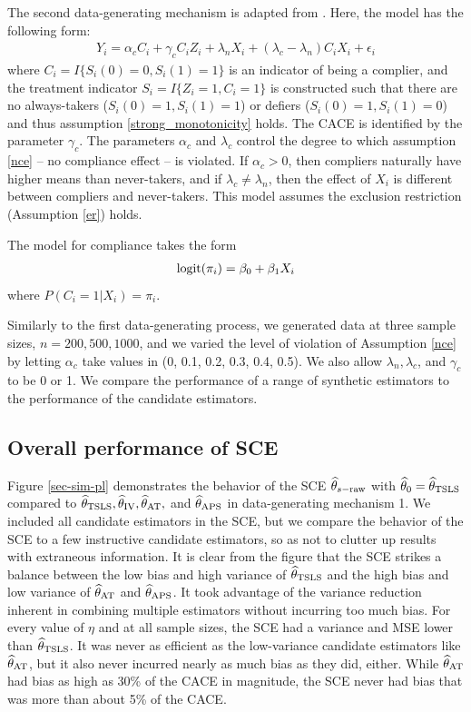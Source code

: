 \documentclass{article}
\def\siv{_{\text{IV}}}
\def\sat{_{\text{AT}}}
\def\stsls{_{\text{TSLS}}}
\def\saps{_{\text{APS}}}
\begin{document}
The second data-generating mechanism is adapted from \citep{stuart2015assessing}. Here, the model has the following form:
\begin{align}
Y_i = \alpha_c C_i + \gamma_cC_iZ_i + \lambda_n X_i + (\lambda_c - \lambda_n)C_iX_i + \epsilon_i
\end{align}
where $C_i = I\{S_i(0) = 0, S_i(1) = 1\}$ is an indicator of being a complier, and the treatment indicator $S_i = I\{Z_i = 1, C_i = 1\}$ is constructed such that there are no always-takers ($S_i(0) = 1, S_i(1) = 1$) or defiers ($S_i(0) = 1, S_i(1) = 0$) and thus assumption \ref{strong_monotonicity} holds. The CACE is identified by the parameter $\gamma_c$. The parameters $\alpha_c$ and $\lambda_c$ control the degree to which assumption \ref{nce} -- no compliance effect -- is violated. If $\alpha_c > 0$, then compliers naturally have higher means than never-takers, and if $\lambda_c \neq \lambda_n$, then the effect of $X_i$ is different between compliers and never-takers. This model assumes the exclusion restriction (Assumption \ref{er}) holds.

The model for compliance takes the form
\begin{align}
\mbox{logit}(\pi_i) = \beta_0 + \beta_1X_i
\end{align}
where $P(C_i = 1 | X_i) = \pi_i$.

Similarly to the first data-generating process, we generated data at three sample sizes, $n = 200, 500, 1000$, and we varied the level of violation of Assumption \ref{nce} by letting $\alpha_c$ take values in (0, 0.1, 0.2, 0.3, 0.4, 0.5).  We also allow $\lambda_n, \lambda_c$, and $\gamma_c$ to be 0 or 1. We compare the performance of a range of synthetic estimators to the performance of the candidate estimators.

\subsection{Overall performance of SCE}
Figure \ref{sec-sim-pl} demonstrates the behavior of the SCE ${\widehat\theta}_{s-\text{raw}}$ with $\thetahat_0 = \thetahat\stsls$ compared to $\thetahat\stsls, \thetahat\siv, \thetahat\sat,$ and $\thetahat\saps$ in data-generating mechanism 1. We included all candidate estimators in the SCE, but we compare the behavior of the SCE to a few instructive candidate estimators, so as not to clutter up results with extraneous information.  It is clear from the figure that the SCE strikes a balance between the low bias and high variance of $\thetahat\stsls$ and the high bias and low variance of $\thetahat\sat$ and $\thetahat\saps$. It took advantage of the variance reduction inherent in combining multiple estimators without incurring too much bias. For every value of $\eta$ and at all sample sizes, the SCE had a variance and MSE lower than $\thetahat\stsls$. It was never as efficient as the low-variance candidate estimators like $\thetahat\sat$, but it also never incurred nearly as much bias as they did, either. While $\thetahat\sat$ had bias as high as 30\% of the CACE in magnitude, the SCE never had bias that was more than about 5\% of the CACE.
\end{document}
